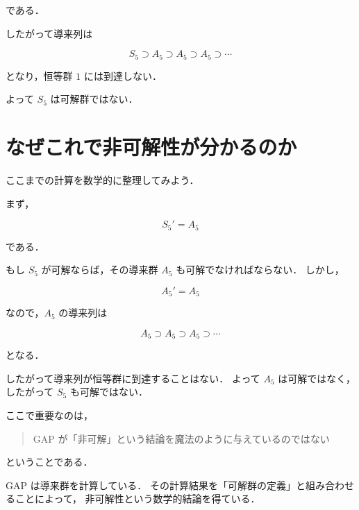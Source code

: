 \documentclass[a4paper,11pt]{jsarticle}
\begin{document}
である．

したがって導来列は

$$
S_5
\supset
A_5
\supset
A_5
\supset
A_5
\supset\cdots
$$

となり，恒等群 $1$ には到達しない．

よって $S_5$ は可解群ではない．

\section{なぜこれで非可解性が分かるのか}

ここまでの計算を数学的に整理してみよう．

まず，

$$
S_5'=A_5
$$

である．

もし $S_5$ が可解ならば，その導来群 $A_5$ も可解でなければならない．
しかし，

$$
A_5'=A_5
$$

なので，$A_5$ の導来列は

$$
A_5\supset A_5\supset A_5\supset\cdots
$$

となる．

したがって導来列が恒等群に到達することはない．
よって $A_5$ は可解ではなく，したがって $S_5$ も可解ではない．

ここで重要なのは，

\begin{quote}
GAP が「非可解」という結論を魔法のように与えているのではない
\end{quote}

ということである．

GAP は導来群を計算している．
その計算結果を「可解群の定義」と組み合わせることによって，
非可解性という数学的結論を得ている．







\end{document}
